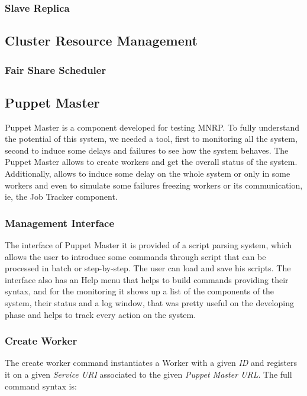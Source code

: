\documentclass[times, 10pt,twocolumn]{article}
\begin{document}
        	\subsubsection{Slave Replica}
    	
    	\subsection{Cluster Resource Management}
    	
            \subsubsection{Fair Share Scheduler}
        
    	\subsection{Puppet Master}
	      Puppet Master is a component developed for testing \ac{MNRP}. To fully understand the potential of this system, we needed a tool, first to monitoring all the system, second to induce some delays and failures to see how the system behaves. The Puppet Master allows to create workers and get the overall status of the system. Additionally, allows to induce some delay on the whole system or only in some workers and even to simulate some failures freezing workers or its communication, ie, the Job Tracker component.
            \subsubsection{Management Interface}
            The interface of Puppet Master it is provided of a script parsing system, which allows the user to introduce some commands through script that can be processed in batch or step-by-step. The user can load and save his scripts. The interface also has an Help menu that helps to build commands providing their syntax, and for the monitoring it shows up a list of the components of the system, their status and a log window, that was pretty useful on the developing phase and helps to track every action on the system.
            \subsubsection{Create Worker}
            The create worker command instantiates a Worker with a given \emph{ID} and registers it on a given \emph{Service URI} associated to the given \emph{Puppet Master URL}. The full command syntax is: 
            
\end{document}

